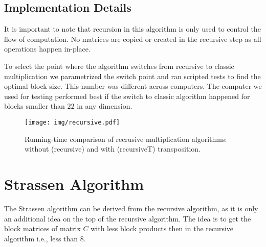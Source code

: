 \documentclass[a4paper,11pt]{article}
\begin{document}
\subsection{Implementation Details} 
It is important to note that recursion in this algorithm is only used to control the flow of computation. No matrices are copied or created in the recursive step as all operations happen in-place. 

To select the point where the algorithm switches from recursive to classic multiplication we parametrized the switch point and ran scripted tests to find the optimal block size. This number was different across computers. The computer we used for testing performed best if the switch to classic algorithm happened for blocks smaller than $22$ in any dimension.


\begin{figure}[h]
\centering
\texttt{[image: img/recursive.pdf]}
\caption{Running-time comparison of recrusive multiplication algorithms: without (\textsf{recursive}) and with (\textsf{recursiveT}) transposition.}
\label{fig:recursive}
\end{figure}





\section{Strassen Algorithm}

The Strassen algorithm can be derived from the recursive algorithm, as it is only an additional idea on the top of the recursive algorithm.
The idea is to get the block matrices of matrix $C$ with less block products then in the recursive algorithm i.e., less than 8.
\end{document}
